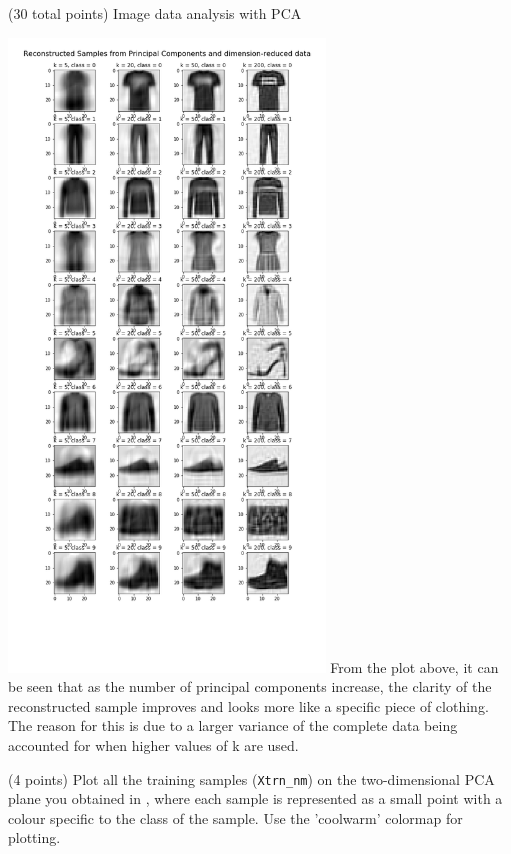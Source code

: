 \documentclass[12pt]{article}
\begin{document}
\begin{question}{(30 total points) Image data analysis with PCA}
\begin{subquestion}
      \begin{answerbox}{52em}
         \includegraphics[width = 0.63\textwidth]{q1_7.png}
         From the plot above, it can be seen that as the number of principal components increase, the clarity of the reconstructed sample improves and looks more like a specific piece of clothing. The reason for this is due to a larger variance of the complete data being accounted for when higher values of k are used.
      \end{answerbox}
  


   \end{subquestion}
   \begin{subquestion}{(4 points)
       Plot all the training samples (\texttt{Xtrn\_nm}) on the
       two-dimensional PCA plane you obtained in , where each sample is
       represented as a small point with a colour specific to the class of
       the sample.  Use the 'coolwarm' colormap for plotting.
     } \label{Q1.8}



\end{subquestion}
\end{question}
\end{document}
